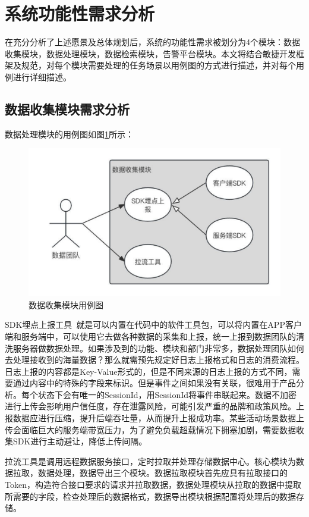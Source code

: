 \section{系统功能性需求分析}
在充分分析了上述愿景及总体规划后，系统的功能性需求被划分为4个模块：数据收集模块，数据处理模块，数据检索模块，告警平台模块。本文将结合敏捷开发框架及规范，对每个模块需要处理的任务场景以用例图的方式进行描述，并对每个用例进行详细描述。
\subsection{数据收集模块需求分析}
数据处理模块的用例图如图\ref{dataColl}所示：
\begin{figure}[htb]
  \centering
  \includegraphics[width=5in]{figure/chapter3/数据收集模块用例图.pdf}
  \caption{数据收集模块用例图}\label{dataColl}
\end{figure}
 
SDK埋点上报工具~\cite{张永勐2022基于用户大数据分析的物联网家电质量改善方法研究}就是可以内置在代码中的软件工具包，可以将内置在APP客户端和服务端中，可以使用它去做各种数据的采集和上报，统一上报到数据团队的清洗服务器做数据处理。如果涉及到的功能、模块和部门非常多，数据处理团队如何去处理接收到的海量数据？那么就需预先规定好日志上报格式和日志的消费流程。日志上报的内容都是Key-Value形式的，但是不同来源的日志上报的方式不同，需要通过内容中的特殊的字段来标识。但是事件之间如果没有关联，很难用于产品分析。每个状态下会有唯一的SessionId，用SessionId将事件串联起来。数据不加密进行上传会影响用户信任度，存在泄露风险，可能引发严重的品牌和政策风险。上报数据应进行压缩，提升后端吞吐量，从而提升上报成功率。某些活动场景数据上传会面临巨大的服务端带宽压力，为了避免负载超载情况下拥塞加剧，需要数据收集SDK进行主动避让，降低上传间隔。

拉流工具是调用远程数据服务接口，定时拉取并处理存储数据中心。核心模块为数据拉取，数据处理，数据导出三个模块。数据拉取模块首先应具有拉取接口的Token，构造符合接口要求的请求并拉取数据，数据处理模块从拉取的数据中提取所需要的字段，检查处理后的数据格式，数据导出模块根据配置将处理后的数据存储。

